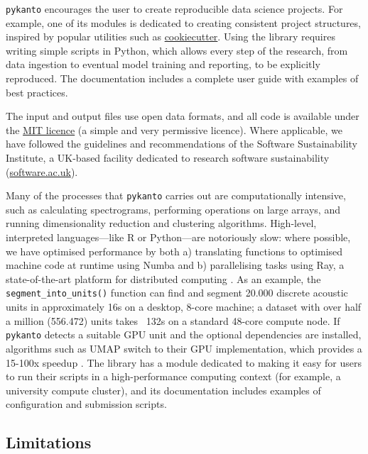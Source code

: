 \texttt{pykanto} encourages the user to create reproducible data science
projects. For example, one of its modules is dedicated to creating consistent
project structures, inspired by popular utilities such as
\href{https://github.com/cookiecutter/cookiecutter}{cookiecutter}. Using the
library requires writing simple scripts in Python, which allows every step of
the research, from data ingestion to eventual model training and reporting, to be
explicitly reproduced. The documentation includes a complete user guide with
examples of best practices.

The input and output files use open data formats, and all code is available
under the \href{https://choosealicense.com/licenses/mit/}{MIT licence} (a simple
and very permissive licence). Where applicable, we have followed the guidelines
and recommendations of the Software Sustainability Institute, a UK-based
facility dedicated to research software sustainability
(\href{https://www.software.ac.uk/}{software.ac.uk}).



Many of the processes that \texttt{pykanto} carries out are computationally
intensive, such as calculating spectrograms, performing operations on large
arrays, and running dimensionality reduction and clustering algorithms.
High-level, interpreted languages---like R or Python---are notoriously slow: where
possible, we have optimised performance by both a) translating functions to
optimised machine code at runtime using Numba \parencite{lam2015} and b)
parallelising tasks using Ray, a state-of-the-art platform for distributed
computing \parencite{moritz2018}. As an example, the \texttt{segment\_into\_units()}
function can find and segment 20.000 discrete acoustic units in approximately
16s on a desktop, 8-core machine; a dataset with over half a million (556.472)
units takes ~132s on a standard 48-core compute node. If \texttt{pykanto} detects a
suitable GPU unit and the optional dependencies are installed, algorithms such
as UMAP \parencite{mcinnes2018} switch to their GPU implementation, which provides a
15-100x speedup \parencite{nolet2021, raschka2020}. The library has a module
dedicated to making it easy for users to run their scripts in a high-performance
computing context (for example, a university compute cluster), and its
documentation includes examples of configuration and submission scripts.

\subsection{Limitations}

